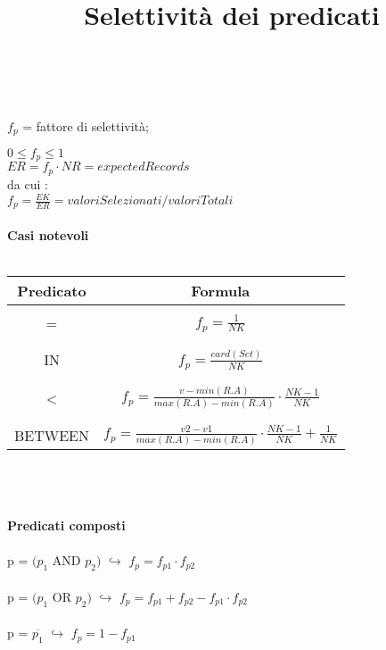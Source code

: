 \documentclass[a4paper,12pt]{article}
\begin{document}
	\begin{titlepage}
		\title{{\huge \textbf{Selettività dei predicati}}} \\ \\
		${f_{p}}$ = fattore di selettività; \space
		\maketitle
		${0 \leq f_{p} \leq 1}$ \\
		${ER = f_{p} \cdot NR = expectedRecords}$ \\
		da cui : \\
		${f_{p} = \tfrac{EK}{ER} = valoriSelezionati/valoriTotali}$ \\ \\
		\textbf{Casi notevoli} \\ \\
		\begin{tabular}{|c|c|}
			\hline 
			\textbf{Predicato} & \textbf{Formula } \\
			\hline \\
			= & ${f_{p} = \tfrac{1}{NK}}$ \\ \\
			\hline \\
			IN & ${f_{p} = \tfrac{card(Set)}{NK}}$\\ \\
			\hline \\ 
			< & ${f_{p} = \tfrac{v - min(R.A)}{max(R.A) - min(R.A)} \cdot \tfrac{NK - 1}{NK}}$ \\ \\
			\hline \\
			BETWEEN & ${f_{p} = \tfrac{v2 - v1}{max(R.A) - min(R.A)} \cdot \tfrac{NK - 1}{NK} + \tfrac{1}{NK}}$ \\
			\hline
		\end{tabular} \\ \\ \\
		\textbf{Predicati composti} \\ \\
		p = ${(p_{1}}$ AND ${p_{2})}$ $\hookrightarrow$ ${f_{p} = f_{p1} \cdot f_{p2}}$ \\ \\
		p = ${(p_{1}}$ OR ${p_{2})}$ $\hookrightarrow$ ${f_{p} = f_{p1} + f_{p2} - f_{p1} \cdot f_{p2}}$ \\ \\
		p = $\overline{p_{1}}$ $\hookrightarrow$ ${f_{p} = 1 - f_{p1}}$
		\begin{titlepage}

\end{titlepage}
\end{titlepage}
\end{document}
